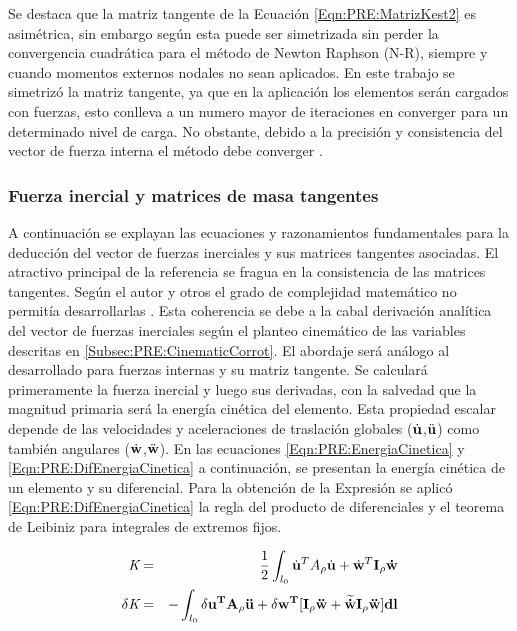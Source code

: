 Se destaca que la matriz tangente de la Ecuación  \eqref{Eqn:PRE:MatrizKest2} es asimétrica, sin embargo según \cite{Rankin1986} esta puede ser simetrizada sin perder la convergencia cuadrática 
para el método de  Newton Raphson (N-R), siempre y cuando momentos externos nodales no sean aplicados. En este trabajo se simetrizó la matriz tangente, ya que en la aplicación los elementos serán cargados con fuerzas, esto conlleva a un numero mayor de iteraciones en converger para un determinado nivel de carga. No obstante, debido a la precisión y consistencia del vector de fuerza interna el método debe converger \cite{Rankin1986}. 

\subsubsection{Fuerza inercial y matrices de masa tangentes}\label{Sec:PRE:Inercial}

A continuación se explayan las ecuaciones y razonamientos fundamentales para la deducción del vector de fuerzas inerciales y sus matrices tangentes asociadas. El atractivo principal de la referencia \citet{Le2014} se fragua en la consistencia de las matrices tangentes. Según el autor y otros el grado de complejidad matemático no permitía desarrollarlas \cite{Crisfield}. Esta coherencia se debe a la cabal derivación analítica del vector de fuerzas inerciales según el planteo cinemático de las variables descritas en \ref{Subsec:PRE:CinematicCorrot}. El abordaje será análogo al desarrollado para fuerzas internas y su matriz tangente. Se calculará primeramente la fuerza inercial y luego sus derivadas, con la salvedad que la magnitud primaria será la energía cinética del elemento. Esta propiedad escalar depende de las velocidades y aceleraciones de traslación globales ($\dot{\bf{u}}$,$\ddot{\bf{u}}$) como también angulares ($\dot{\bf{w}}$,$\ddot{\bf{w}}$). En las ecuaciones \eqref{Eqn:PRE:EnergiaCinetica} y \eqref{Eqn:PRE:DifEnergiaCinetica} a continuación, se presentan la energía cinética de un elemento y su diferencial. Para la obtención de la Expresión se aplicó \eqref{Eqn:PRE:DifEnergiaCinetica} la regla del producto de diferenciales y el teorema de Leibiniz para integrales de extremos fijos. 

\begin{eqnarray}
		\textit{K}&=&\frac{1}{2}\int_{l_0} \dot{\bf{u}}^T A_{\rho} \dot{\bf{u}} +
		\dot{\bf{w}}^T \bf{I_{\rho}}\dot{\bf{w}}
		\label{Eqn:PRE:EnergiaCinetica}\\
		\delta\textit{K}&=&-\int_{l_0} \delta \bf{u}^T A_{\rho} \ddot{\bf{u}} +\delta
		\bf{w}^T[\bf{I_{\rho}}\ddot{\bf{w}}+\widetilde{\dot{\bf{w}}}\bf{I_{\rho}}\ddot{\bf{w}}]
		dl	
		\label{Eqn:PRE:DifEnergiaCinetica}
\end{eqnarray}


